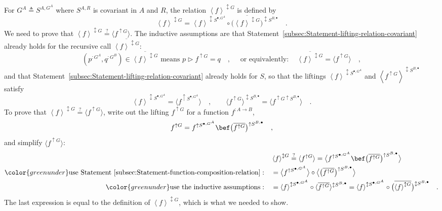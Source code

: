 For $G^{A}\triangleq S^{A,G^{A}}$ where $S^{A,R}$ is covariant in
$A$ and $R$, the relation $\left<f\right>^{\updownarrow G}$ is
defined by
\[
\left<f\right>^{\updownarrow G}=\left<f\right>^{\updownarrow S^{\bullet,G^{A}}}\circ\big(\overline{\left<f\right>^{\updownarrow G}}\big)^{\updownarrow S^{B,\bullet}}\quad.
\]
We need to prove that $\left<f\right>^{\updownarrow G}\overset{?}{=}\langle f^{\uparrow G}\rangle$.
The inductive assumptions are that Statement~\ref{subsec:Statement-lifting-relation-covariant}
already holds for the recursive call $\overline{\left<f\right>^{\updownarrow G}}$:
\[
(p^{:G^{A}},q^{:G^{B}})\in\overline{\left<f\right>^{\updownarrow G}}\text{ means }p\triangleright f^{\uparrow G}=q\quad,\quad\text{ or equivalently}:\quad\overline{\left<f\right>^{\updownarrow G}}=\langle f^{\uparrow G}\rangle\quad,
\]
and that Statement~\ref{subsec:Statement-lifting-relation-covariant}
already holds for $S$, so that the liftings $\left<f\right>^{\updownarrow S^{\bullet,G^{A}}}$
and $\left<f^{\uparrow G}\right>^{\updownarrow S^{B,\bullet}}$ satisfy
\[
\left<f\right>^{\updownarrow S^{\bullet,G^{A}}}=\langle f^{\uparrow S^{\bullet,G^{A}}}\rangle\quad,\quad\quad\langle f^{\uparrow G}\rangle^{\updownarrow S^{B,\bullet}}=\langle f^{\uparrow G\uparrow S^{B,\bullet}}\rangle\quad.
\]
To prove that $\left<f\right>^{\updownarrow G}\overset{?}{=}\langle f^{\uparrow G}\rangle$,
write out the lifting $f^{\uparrow G}$ for a function $f^{:A\rightarrow B}$,
\[
f^{\uparrow G}=f^{\uparrow S^{\bullet,G^{A}}}\bef\big(\overline{f^{\uparrow G}}\big)^{\uparrow S^{B,\bullet}}\quad,
\]
and simplify $\langle f^{\uparrow G}\rangle$:
\begin{align*}
 & \left<f\right>^{\updownarrow G}\overset{?}{=}\langle f^{\uparrow G}\rangle=\big\langle f^{\uparrow S^{\bullet,G^{A}}}\bef\big(\overline{f^{\uparrow G}}\big)^{\uparrow S^{B,\bullet}}\big\rangle\\
{\color{greenunder}\text{use Statement~\ref{subsec:Statement-function-composition-relation}}:}\quad & =\big\langle f^{\uparrow S^{\bullet,G^{A}}}\big\rangle\circ\big\langle\big(\overline{f^{\uparrow G}}\big)^{\uparrow S^{B,\bullet}}\big\rangle\\
{\color{greenunder}\text{use the inductive assumptions}:}\quad & =\left<f\right>^{\updownarrow S^{\bullet,G^{A}}}\circ\langle\overline{f^{\uparrow G}}\rangle^{\updownarrow S^{B,\bullet}}=\left<f\right>^{\updownarrow S^{\bullet,G^{A}}}\circ\big(\overline{\left<f\right>^{\updownarrow G}}\big)^{\updownarrow S^{B,\bullet}}\quad.
\end{align*}
The last expression is equal to the definition of $\left<f\right>^{\updownarrow G}$,
which is what we needed to show.

